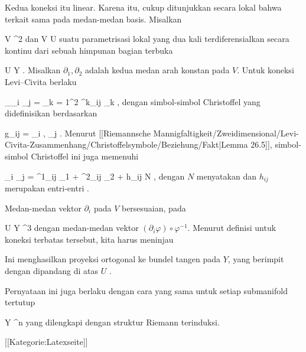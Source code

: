 {

Kedua koneksi itu linear. Karena itu, cukup ditunjukkan secara lokal bahwa
terkait sama pada medan-medan basis. Misalkan

\mavergleichskette
{\vergleichskette
{ V
}
{ \subseteq }{ \R^2
}
{  }{
}
{    }{
}
{   }{
}
}
{}{}{}
dan
\maabbdisp {\varphi} { V } { U
} {}
suatu parametrisasi lokal yang dua kali terdiferensialkan secara kontinu dari sebuah himpunan bagian terbuka

\mavergleichskette
{\vergleichskette
{ U
}
{ \subseteq }{ Y
}
{  }{
}
{    }{
}
{   }{
}
}
{}{}{.}
Misalkan $\partial_1,\partial_2$ adalah kedua medan arah konstan pada $V$. Untuk koneksi Levi--Civita berlaku

\mavergleichskettedisp
{\vergleichskette
{ \nabla_{\partial_i } \partial_j
}
{ =} { \sum_{k = 1}^2  \Gamma^k_{ij} \partial_k
}
{ } {
}
{ } {
}
{ } {
}
}
{}{}{,}
dengan simbol-simbol Christoffel yang didefinisikan berdasarkan

\mavergleichskettedisp
{\vergleichskette
{ g_{ij}
}
{ =} { \left\langle  \partial_i \varphi ,  \partial_j \varphi  \right\rangle
}
{ } {
}
{ } {
}
{ } {
}
}
{}{}{.}
Menurut
[[Riemannsche Mannigfaltigkeit/Zweidimensional/Levi-Civita-Zusammenhang/Christoffelsymbole/Beziehung/Fakt|Lemma 26.5]],
simbol-simbol Christoffel ini juga memenuhi

\mavergleichskettedisp
{\vergleichskette
{ \partial_i \partial_j \varphi
}
{ =} { \Gamma^1_{ij} \partial_1  \varphi +  \Gamma^2_{ij}  \partial_2  \varphi+   h_{ij} N
}
{ } {
}
{ } {
}
{ } {
}
}
{}{}{,}
dengan $N$ menyatakan
dan $h_{ij}$ merupakan entri-entri
 {} {.}

Medan-medan vektor $\partial_i$ pada $V$ bersesuaian, pada

\mavergleichskette
{\vergleichskette
{ U
}
{ \subseteq }{ Y
}
{ \subseteq }{ \R^3
}
{    }{
}
{   }{
}
}
{}{}{}
dengan medan-medan vektor $\left(  \partial_i \varphi  \right)  \circ \varphi^{-1}$. Menurut definisi
untuk koneksi terbatas tersebut, kita harus meninjau

 {  }

Ini menghasilkan proyeksi ortogonal
ke bundel tangen pada $Y$, yang berimpit dengan
dipandang di atas $U$
 {} {.}

}

Pernyataan ini juga berlaku dengan cara yang sama untuk setiap submanifold tertutup

\mavergleichskette
{\vergleichskette
{ Y
}
{ \subseteq }{ \R^n
}
{  }{
}
{    }{
}
{   }{
}
}
{}{}{}
yang dilengkapi dengan struktur Riemann terinduksi.

 [[Kategorie:Latexseite]]
